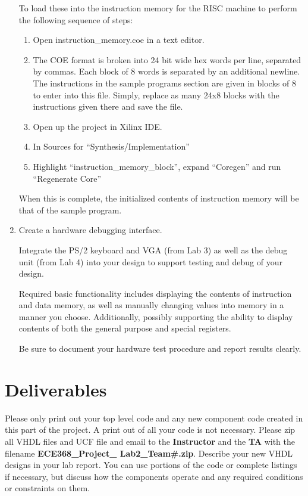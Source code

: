\documentclass{article}
\begin{document}
\begin{enumerate}
To load these into the instruction memory for the RISC machine to perform the following sequence of steps:


\begin{enumerate}
  \item Open instruction\_memory.coe in a text editor.
  \item The COE format is broken into 24 bit wide hex words per line, separated by commas. Each block of 8 words is separated by an additional newline. The instructions in the sample programs section are given in blocks of 8 to enter into this file. Simply, replace as many 24x8 blocks with the instructions given there and save the file.
  \item Open up the project in Xilinx IDE.
  \item In Sources for “Synthesis/Implementation” 
  \item Highlight “instruction\_memory\_block”, expand “Coregen” and run “Regenerate Core”
\end{enumerate}

When this is complete, the initialized contents of instruction memory will be that of the sample program.

\item Create a hardware debugging interface. 

Integrate the PS/2 keyboard and VGA (from Lab 3) as well as the debug unit (from Lab 4) into your design to support testing and debug of your design.

Required basic functionality includes displaying the contents of instruction and data memory, as well as manually changing values into memory in a manner you choose. Additionally, possibly supporting the ability to display contents of both the general purpose and special registers.

Be sure to document your hardware test procedure and report results clearly.

\end{enumerate}

\section{Deliverables}

Please only print out your top level code and any new component code created in this part of the project. A print out of all your code is not necessary. Please zip all VHDL files and UCF file and email to the \textbf{Instructor} and the \textbf{TA} with the filename \textbf{ECE368\_Project\_ Lab2\_Team\#.zip}. Describe your new VHDL designs in your lab report. You can use portions of the code or complete listings if necessary, but discuss how the components operate and any required conditions or constraints on them.
\end{document}
